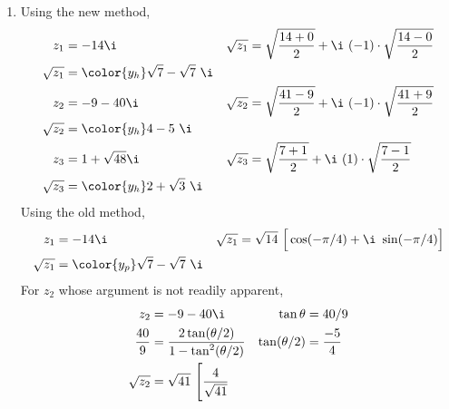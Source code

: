 \begin{enumerate}
\begin{enumerate}
              \item Using the new method,
                    \begin{align}
                        z_1        & = -14\i                               &
                        \sqrt{z_1} & = \sqrt{\frac{14 + 0}{2}}
                        + \i\ (-1) \cdot \sqrt{\frac{14 - 0}{2}}             \\
                        \sqrt{z_1} & = \color{y_h} \sqrt{7} - \sqrt{7}\ \i   \\
                        z_2        & = -9 - 40\i                           &
                        \sqrt{z_2} & = \sqrt{\frac{41 - 9}{2}}
                        + \i\ (-1) \cdot \sqrt{\frac{41 + 9}{2}}             \\
                        \sqrt{z_2} & = \color{y_h} 4 - 5\ \i                 \\
                        z_3        & = 1 + \sqrt{48}\i                     &
                        \sqrt{z_3} & = \sqrt{\frac{7 + 1}{2}}
                        + \i\ (1) \cdot \sqrt{\frac{7 - 1}{2}}               \\
                        \sqrt{z_3} & = \color{y_h} 2 + \sqrt{3}\ \i
                    \end{align}
                    Using the old method,
                    \begin{align}
                        z_1        & = -14\i                         &
                        \sqrt{z_1} & = \sqrt{14}\ \Big[ \cos(-\pi/4)
                        + \i\ \sin(-\pi/4) \Big]                       \\
                        \sqrt{z_1} & = \color{y_p} \sqrt{7}
                        - \sqrt{7}\ \i
                    \end{align}
                    For $ z_2 $ whose argument is not readily apparent,
                    \begin{align}
                        z_2                              & = -9 - 40\i              &
                        \tan\theta                       & = 40/9                     \\
                        \frac{40}{9}                     & = \frac{2\tan(\theta/2)}
                        {1 - \tan^2(\theta/2)}           &
                        \tan(\theta/2)                   & = \frac{-5}{4}             \\
                        \sqrt{z_2}                       & = \sqrt{41}
                        \ \Bigg[ \frac{4}{\sqrt{41}}

\end{align}
\end{enumerate}
\end{enumerate}
